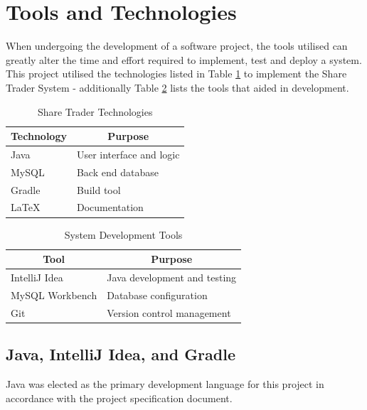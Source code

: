 \documentclass[12pt, a4paper,titlepage]{article}
\begin{document}
\section{Tools and Technologies}
When undergoing the development of a software project, the tools utilised can
greatly alter the time and effort required to implement, test and deploy a
system.
This project utilised the technologies listed in Table \ref{table-tech} to
implement the Share Trader System - additionally Table \ref{table-tool} lists
the tools that aided in development.

\begin{table}[h]
    \centering
    \begin{tabular}{|l|l|}
        \hline
        \textbf{Technology}  & \multicolumn{1}{c|}{\textbf{Purpose}} \\ \hline
        Java        & User interface and logic     \\ \hline
        MySQL       & Back end database            \\ \hline
        Gradle      & Build tool                   \\ \hline
        \LaTeX      & Documentation                \\ \hline
    \end{tabular}
    \caption{Share Trader Technologies}
    \label{table-tech}
\end{table}

\begin{table}[h]
    \centering
    \begin{tabular}{|l|l|}
        \hline
        \multicolumn{1}{|c|}{\textbf{Tool}} &
        \multicolumn{1}{c|}{\textbf{Purpose}} \\ \hline
        IntelliJ Idea                       & Java development and testing
        \\ \hline
        MySQL Workbench                     & Database configuration
        \\ \hline
        Git                                 & Version control management
        \\ \hline
    \end{tabular}
    \caption{System Development Tools}
    \label{table-tool}
\end{table}


\subsection{Java, IntelliJ Idea, and Gradle}
Java was elected as the primary development language for this project in
accordance with the project specification document.
\end{document}
